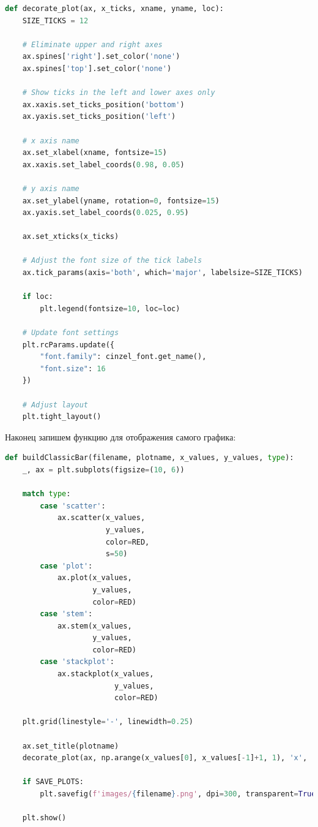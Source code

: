 \documentclass[a4paper, 14pt]{extarticle}
\begin{document}
\begin{center}
    \begin{lstlisting}[language=Python]
def decorate_plot(ax, x_ticks, xname, yname, loc):
    SIZE_TICKS = 12

    # Eliminate upper and right axes
    ax.spines['right'].set_color('none')
    ax.spines['top'].set_color('none')

    # Show ticks in the left and lower axes only
    ax.xaxis.set_ticks_position('bottom')
    ax.yaxis.set_ticks_position('left')

    # x axis name
    ax.set_xlabel(xname, fontsize=15)
    ax.xaxis.set_label_coords(0.98, 0.05)

    # y axis name
    ax.set_ylabel(yname, rotation=0, fontsize=15)
    ax.yaxis.set_label_coords(0.025, 0.95)

    ax.set_xticks(x_ticks)

    # Adjust the font size of the tick labels
    ax.tick_params(axis='both', which='major', labelsize=SIZE_TICKS)

    if loc:
        plt.legend(fontsize=10, loc=loc)

    # Update font settings
    plt.rcParams.update({
        "font.family": cinzel_font.get_name(), 
        "font.size": 16
    })

    # Adjust layout
    plt.tight_layout()
    \end{lstlisting}
\end{center}

Наконец запишем функцию для отображения самого графика:

\begin{center}
    \begin{lstlisting}[language=Python]
def buildClassicBar(filename, plotname, x_values, y_values, type):
    _, ax = plt.subplots(figsize=(10, 6))

    match type:
        case 'scatter':
            ax.scatter(x_values, 
                       y_values, 
                       color=RED,
                       s=50)
        case 'plot':
            ax.plot(x_values, 
                    y_values, 
                    color=RED)
        case 'stem':
            ax.stem(x_values, 
                    y_values, 
                    color=RED)
        case 'stackplot':
            ax.stackplot(x_values, 
                         y_values, 
                         color=RED)

    plt.grid(linestyle='-', linewidth=0.25)

    ax.set_title(plotname)
    decorate_plot(ax, np.arange(x_values[0], x_values[-1]+1, 1), 'x', 'y', '')
    
    if SAVE_PLOTS:
        plt.savefig(f'images/{filename}.png', dpi=300, transparent=True)

    plt.show()
    \end{lstlisting}
\end{center}
\end{document}
